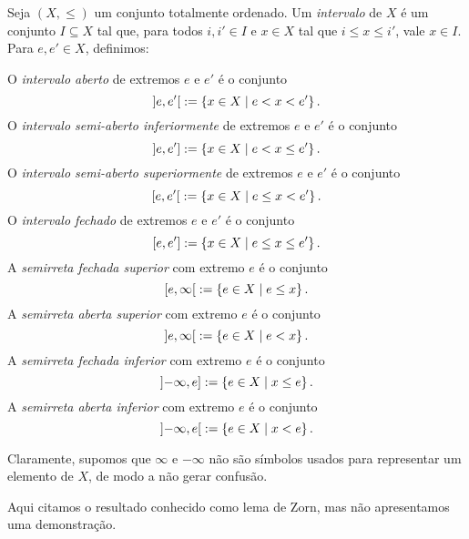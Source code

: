 \begin{definition}
	Seja $(X,\leq)$ um conjunto totalmente ordenado. Um \emph{intervalo} de $X$ é um conjunto $I \subseteq X$ tal que, para todos $i,i' \in I$ e $x \in X$ tal que $i \leq x \leq i'$, vale $x \in I$. Para $e,e' \in X$, definimos:
	
	O \emph{intervalo aberto} de extremos $e$ e $e'$ é o conjunto
		\begin{equation*}
			\left]{e},{e'}\right[ := \left\{{x \in X}\;\middle\vert\;{e < x < e'}\right\}.
		\end{equation*}
	O \emph{intervalo semi-aberto inferiormente} de extremos $e$ e $e'$ é o conjunto
		\begin{equation*}
			\left]{e},{e'}\right] := \left\{{x \in X}\;\middle\vert\;{e < x \leq e'}\right\}.
		\end{equation*}
	O \emph{intervalo semi-aberto superiormente} de extremos $e$ e $e'$ é o conjunto
		\begin{equation*}
			\left[{e},{e'}\right[ := \left\{{x \in X}\;\middle\vert\;{e \leq x < e'}\right\}.
		\end{equation*}
	O \emph{intervalo fechado} de extremos $e$ e $e'$ é o conjunto
		\begin{equation*}
			\left[{e},{e'}\right] := \left\{{x \in X}\;\middle\vert\;{e \leq x \leq e'}\right\}.
		\end{equation*}
	A \emph{semirreta fechada superior} com extremo $e$ é o conjunto
		\begin{equation*}
			\left[{e},{\infty}\right[ := \left\{{e \in X}\;\middle\vert\;{e \leq x}\right\}.
		\end{equation*}
	A \emph{semirreta aberta superior} com extremo $e$ é o conjunto
		\begin{equation*}
			\left]{e},{\infty}\right[ := \left\{{e \in X}\;\middle\vert\;{e < x}\right\}.
		\end{equation*}
	A \emph{semirreta fechada inferior} com extremo $e$ é o conjunto
		\begin{equation*}
			\left]{-\infty},{e}\right] := \left\{{e \in X}\;\middle\vert\;{x \leq e}\right\}.
		\end{equation*}
	A \emph{semirreta aberta inferior} com extremo $e$ é o conjunto
		\begin{equation*}
			\left]{-\infty},{e}\right[ := \left\{{e \in X}\;\middle\vert\;{x < e}\right\}.
		\end{equation*}
\end{definition}

Claramente, supomos que $\infty$ e $-\infty$ não são símbolos usados para representar um elemento de $X$, de modo a não gerar confusão.



Aqui citamos o resultado conhecido como lema de Zorn, mas não apresentamos uma demonstração.

